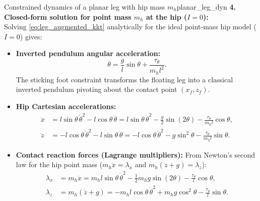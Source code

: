 \documentclass[11pt,a4paper]{article}
\begin{document}
\begin{example}{Constrained dynamics of a planar leg with hip mass $m_h$}{planar_leg_dyn}
\textbf{4. Closed-form solution for point mass $m_h$ at the hip ($I = 0$):}\\
Solving \eqref{eq:leg_augmented_kkt} analytically for the ideal point-mass hip model ($I = 0$) gives:
\begin{itemize}[nosep]
  \item \textbf{Inverted pendulum angular acceleration:}
  \begin{equation}\label{eq:leg_thetaddot}
    \ddot\theta = \frac{g}{l}\sin\theta + \frac{\tau_\theta}{m_h l^2}.
  \end{equation}
  The sticking foot constraint transforms the floating leg into a classical inverted pendulum pivoting about the contact point $(x_f, z_f)$.
  \item \textbf{Hip Cartesian accelerations:}
  \begin{align}
    \ddot x &= l\sin\theta\,\dot\theta^2 - l\cos\theta\,\ddot\theta = l\sin\theta\,\dot\theta^2 - \frac{g}{2}\sin(2\theta) - \frac{\tau_\theta}{m_h l}\cos\theta, \label{eq:leg_xddot}\\
    \ddot z &= -l\cos\theta\,\dot\theta^2 - l\sin\theta\,\ddot\theta = -l\cos\theta\,\dot\theta^2 - g\sin^2\theta - \frac{\tau_\theta}{m_h l}\sin\theta. \label{eq:leg_zddot}
  \end{align}
  \item \textbf{Contact reaction forces (Lagrange multipliers):}
  From Newton's second law for the hip point mass ($m_h \ddot x = \lambda_x$ and $m_h (\ddot z + g) = \lambda_z$):
  \begin{align}
    \lambda_x &= m_h \ddot x = m_h l\sin\theta\,\dot\theta^2 - \frac{1}{2}m_h g\sin(2\theta) - \frac{\tau_\theta}{l}\cos\theta, \label{eq:leg_lambdax}\\
    \lambda_z &= m_h(\ddot z + g) = -m_h l\cos\theta\,\dot\theta^2 + m_h g\cos^2\theta - \frac{\tau_\theta}{l}\sin\theta. \label{eq:leg_lambdaz}
  \end{align}
\end{itemize}


\end{example}
\end{document}
